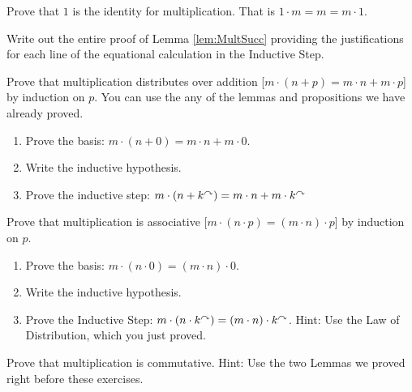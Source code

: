 \begin{exer}
  \begin{exercise}
\item Prove that $1$ is the identity for multiplication. That is $1\cdot m = m  = m\cdot 1$.
\item Write out the entire proof of Lemma \ref{lem:MultSucc} providing the justifications for each line of the equational calculation in the Inductive Step.
\item Prove that multiplication distributes over addition [$m\cdot
  (n+p) = m\cdot n + m\cdot p$] by induction on $p$.  You can use the any of the lemmas and propositions we have
  already proved.
  \begin{enumerate}
  \item Prove the basis: $m\cdot(n+0) = m\cdot n + m\cdot 0$.
  \item Write the inductive hypothesis.
  \item Prove the inductive step: $m\cdot(n+k^\curvearrowright) = m\cdot n +
    m\cdot k^\curvearrowright$
  \end{enumerate}
 
\item Prove that multiplication is associative [$m\cdot(n\cdot p) =
  (m\cdot n)\cdot p$] by induction on $p$.
  \begin{enumerate}
  \item Prove the basis: $m\cdot (n\cdot 0) = (m\cdot n)\cdot 0$.
  \item Write the inductive hypothesis.
  \item Prove the Inductive Step: $m\cdot (n\cdot k^\curvearrowright) = (m\cdot
    n)\cdot k^\curvearrowright$. 
    Hint: Use the Law of Distribution, which you just
    proved.
  \end{enumerate}

\item Prove that multiplication is commutative. 
Hint: Use the two Lemmas we proved right before these exercises.

  \end{exercise}
\end{exer}
%
%
%
%
